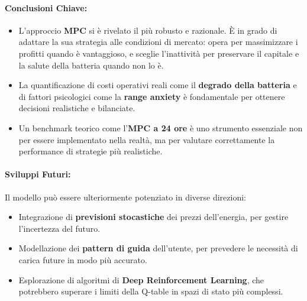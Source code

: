 \documentclass[11pt, a4paper]{article}
\begin{document}
\paragraph{Conclusioni Chiave:}
\begin{itemize}
    \item L'approccio \textbf{MPC} si è rivelato il più robusto e razionale. È in grado di adattare la sua strategia alle condizioni di mercato: opera per massimizzare i profitti quando è vantaggioso, e sceglie l'inattività per preservare il capitale e la salute della batteria quando non lo è.
    \item La quantificazione di costi operativi reali come il \textbf{degrado della batteria} e di fattori psicologici come la \textbf{range anxiety} è fondamentale per ottenere decisioni realistiche e bilanciate.
    \item Un benchmark teorico come l'\textbf{MPC a 24 ore} è uno strumento essenziale non per essere implementato nella realtà, ma per valutare correttamente la performance di strategie più realistiche.
\end{itemize}

\paragraph{Sviluppi Futuri:}
Il modello può essere ulteriormente potenziato in diverse direzioni:
\begin{itemize}
    \item Integrazione di \textbf{previsioni stocastiche} dei prezzi dell'energia, per gestire l'incertezza del futuro.
    \item Modellazione dei \textbf{pattern di guida} dell'utente, per prevedere le necessità di carica future in modo più accurato.
    \item Esplorazione di algoritmi di \textbf{Deep Reinforcement Learning}, che potrebbero superare i limiti della Q-table in spazi di stato più complessi.
\end{itemize}
\end{document}
